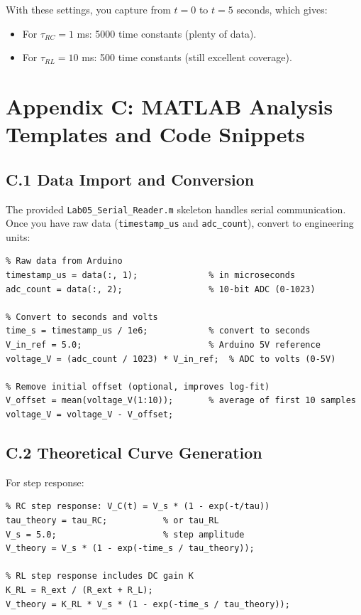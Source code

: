 \documentclass[11pt,letterpaper]{article}
\begin{document}
\noindent
With these settings, you capture from $t=0$ to $t=5$ seconds, which gives:
\begin{itemize}
    \item For $\tau_{RC} = 1$ ms: 5000 time constants (plenty of data).
    \item For $\tau_{RL} = 10$ ms: 500 time constants (still excellent coverage).
\end{itemize}

\section*{Appendix C: MATLAB Analysis Templates and Code Snippets}

\subsection*{C.1 Data Import and Conversion}

The provided \texttt{Lab05\_Serial\_Reader.m} skeleton handles serial communication. Once you have raw data (\texttt{timestamp\_us} and \texttt{adc\_count}), convert to engineering units:

\begin{verbatim}
% Raw data from Arduino
timestamp_us = data(:, 1);              % in microseconds
adc_count = data(:, 2);                 % 10-bit ADC (0-1023)

% Convert to seconds and volts
time_s = timestamp_us / 1e6;            % convert to seconds
V_in_ref = 5.0;                         % Arduino 5V reference
voltage_V = (adc_count / 1023) * V_in_ref;  % ADC to volts (0-5V)

% Remove initial offset (optional, improves log-fit)
V_offset = mean(voltage_V(1:10));       % average of first 10 samples
voltage_V = voltage_V - V_offset;
\end{verbatim}

\subsection*{C.2 Theoretical Curve Generation}

For step response:
\begin{verbatim}
% RC step response: V_C(t) = V_s * (1 - exp(-t/tau))
tau_theory = tau_RC;           % or tau_RL
V_s = 5.0;                     % step amplitude
V_theory = V_s * (1 - exp(-time_s / tau_theory));

% RL step response includes DC gain K
K_RL = R_ext / (R_ext + R_L);
V_theory = K_RL * V_s * (1 - exp(-time_s / tau_theory));
\end{verbatim}
\end{document}
